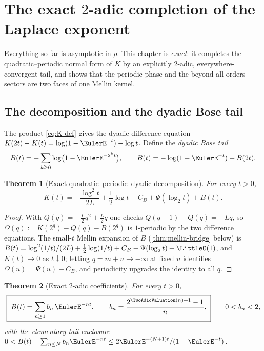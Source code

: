 \documentclass[11pt,oneside]{article}
\numberwithin{equation}{section}
\newtheorem{theorem}{Theorem}[section]
\theoremstyle{definition}
\theoremstyle{remark}
\newcommand{\CB}{C_{B}}
\begin{document}
\section{The exact \texorpdfstring{$2$}{2}-adic completion of the
Laplace exponent}
\label{sec:dyadic-completion}

Everything so far is asymptotic in $\rho$.  This chapter is
\emph{exact}: it completes the quadratic--periodic normal form of
$K$ by an explicitly $2$-adic, everywhere-convergent tail, and shows
that the periodic phase and the beyond-all-orders sectors are two
faces of one Mellin kernel.

\subsection{The decomposition and the dyadic Bose tail}

The product \eqref{eq:K-def} gives the dyadic difference equation
$K(2t)-K(t)=\log(1-\EulerE^{-t})-\log t$.  Define the \emph{dyadic Bose
tail}
\begin{equation}
 B(t)=-\sum_{k\ge0}\log\bigl(1-\EulerE^{-2^{k}t}\bigr),
 \qquad
 B(t)=-\log(1-\EulerE^{-t})+B(2t).
 \label{eq:B-def}
\end{equation}

\begin{theorem}[Exact quadratic--periodic--dyadic decomposition]
\label{thm:K-decomposition}
For every $t>0$,
\begin{equation}
 \boxed{\;
 K(t)=-\frac{\log^{2}t}{2L}+\frac12\log t-\CB
 +\Psi(\log_2t)+B(t).
 \;}
 \label{eq:K-decomposition}
\end{equation}
\end{theorem}

\begin{proof}
With $Q(q)=-\tfrac L2q^{2}+\tfrac L2q$ one checks
$Q(q+1)-Q(q)=-Lq$, so
$\Omega(q):=K(2^{q})-Q(q)-B(2^{q})$ is $1$-periodic by the two
difference equations.  The small-$t$ Mellin expansion of $B$
(\cref{thm:mellin-bridge} below) is
$B(t)=\log^{2}(1/t)/(2L)+\tfrac12\log(1/t)+\CB-\Psi(\log_2t)+
\LittleO(1)$, and $K(t)\to0$ as $t\downarrow0$; letting
$q=m+u\to-\infty$ at fixed $u$ identifies
$\Omega(u)=\Psi(u)-\CB$, and periodicity upgrades the identity to
all $q$.
\end{proof}

\begin{theorem}[Exact $2$-adic coefficients]
\label{thm:B-2adic}
For every $t>0$,
\begin{equation}
 \boxed{\;
 B(t)=\sum_{n\ge1}b_n\,\EulerE^{-nt},
 \qquad
 b_n=\frac{2^{\TwoAdicValuation(n)+1}-1}{n},
 \;}
 \qquad
 0<b_n<2,
 \label{eq:B-2adic}
\end{equation}
with the elementary tail enclosure
$0<B(t)-\sum_{n\le N}b_n\EulerE^{-nt}\le2\EulerE^{-(N+1)t}/(1-\EulerE^{-t})$.
\end{theorem}
\end{document}
